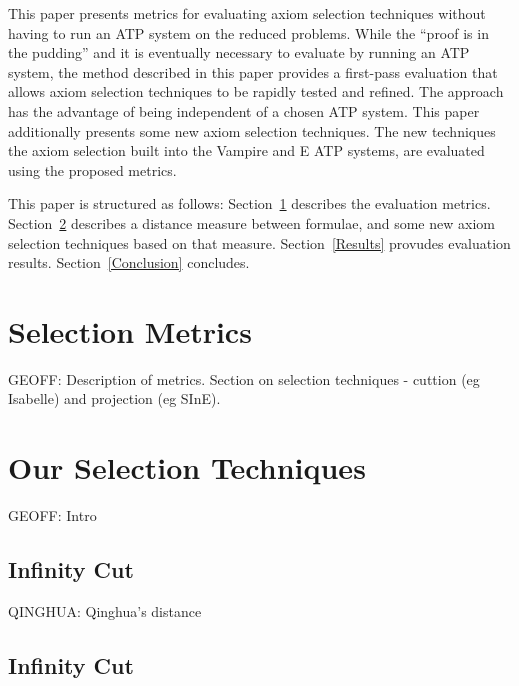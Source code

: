 \documentclass[EPiC]{easychair}
\begin{document}
This paper presents metrics for evaluating axiom selection techniques
without having to run an ATP system on the reduced problems.
While the ``proof is in the pudding'' and it is eventually necessary to
evaluate by running an ATP system, the method described in this paper
provides a first-pass evaluation that allows axiom selection techniques to
be rapidly tested and refined.
The approach has the advantage of being independent of a chosen ATP system.
This paper additionally presents some new axiom selection techniques. 
The new techniques the axiom selection built into the Vampire \cite{KV13} and 
E \cite{SCV19} ATP systems, are evaluated using the proposed metrics.

This paper is structured as follows:
Section~\ref{Metrics} describes the evaluation metrics.
Section~\ref{Ours} describes a distance measure between formulae, and
some new axiom selection techniques based on that measure.
Section~\ref{Results} provudes evaluation results.
Section~\ref{Conclusion} concludes.

\section{Selection Metrics}
\label{Metrics}

GEOFF:
Description of metrics.
Section on selection techniques - cuttion (eg Isabelle) and projection (eg
SInE). 

\section{Our Selection Techniques}
\label{Ours}

GEOFF:
Intro

\subsection{Infinity Cut}
\label{QinghuaInf}

QINGHUA:
Qinghua's distance

\subsection{Infinity Cut}
\label{QinghuaInf}
\end{document}
